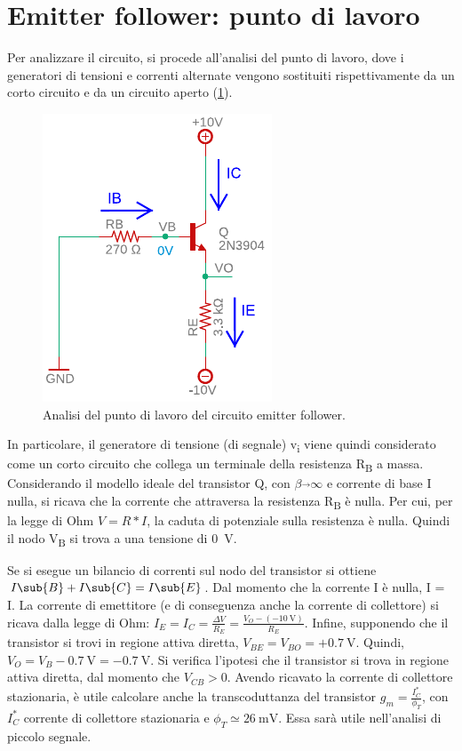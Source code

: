 \section{Emitter follower: punto di lavoro}
Per analizzare il circuito, si procede all'analisi del punto di lavoro, dove i generatori di tensioni e correnti alternate vengono sostituiti rispettivamente da un corto circuito e da un circuito aperto (\Fig\ref{fig:emitterfollwer_puntodilavoro}).
\begin{figure}[h!]
	\centering
	\includegraphics[width=0.4\linewidth]{./OtherFiles/Laboratorio 1/emitter follower_punto di lavoro_printout}
	\caption{Analisi del punto di lavoro del circuito emitter follower.}
	\label{fig:emitterfollwer_puntodilavoro}
\end{figure}
In particolare, il generatore di tensione (di segnale) v\textsubscript{i} viene quindi considerato come un corto circuito che collega un terminale della resistenza R\textsubscript{B} a massa. Considerando il modello ideale del transistor Q, con $\beta\overrightarrow{}\infty$ e corrente di base I nulla, si ricava che la corrente che attraversa la resistenza R\textsubscript{B} è nulla. Per cui, per la legge di Ohm $V=R*I$, la caduta di potenziale sulla resistenza è nulla. Quindi il nodo V\textsubscript{B} si trova a una tensione di \SI{0}{\volt}. 

Se si esegue un bilancio di correnti sul nodo del transistor si ottiene $I\sub{B}+I\sub{C}=I\sub{E}$. Dal momento che la corrente I è nulla, I = I. La corrente di emettitore (e di conseguenza anche la corrente di collettore) si ricava dalla legge di Ohm: $I_E=I_C=\frac{\Delta V}{R_E}=\frac{V_O-(-\SI{10}{\volt})}{R_E}$. Infine, supponendo che il transistor si trovi in regione attiva diretta, $V_{BE}=V_{BO}=+\SI{0.7}{\volt}$. Quindi, $V_O=V_B-\SI{0.7}{\volt}= -\SI{0.7}{\volt}$. Si verifica l'ipotesi che il transistor si trova in regione attiva diretta, dal momento che $V_{CB}>0$. Avendo ricavato la corrente di collettore stazionaria, è utile calcolare anche la transcoduttanza del transistor $g_m=\frac{I_C^*}{\phi_T}$, con $I_C^*$ corrente di collettore stazionaria e $\phi_T\simeq\SI{26}{\milli\volt}$. Essa sarà utile nell'analisi di piccolo segnale.

